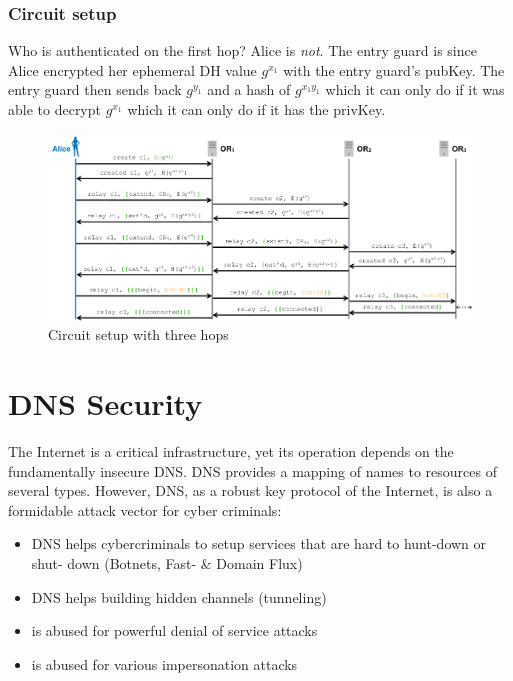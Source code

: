 \documentclass[11pt,oneside,a4paper]{article}
\begin{document}
\subsubsection{Circuit setup}

Who is authenticated on the first hop? Alice is \textit{not}. The entry guard is since Alice encrypted her ephemeral DH value $g^{x_1}$ with the entry guard's pubKey. The entry guard then sends back $g^{y_1}$ and a hash of $g^{x_1y_1}$ which it can only do if it was able to decrypt $g^{x_1}$ which it can only do if it has the privKey.
\begin{figure}[hb]
	\centering
	\includegraphics[width=0.9\linewidth]{figures/tor_circuit_setup}
	\caption{Circuit setup with three hops}
	\label{fig:torcircuitsetup}
\end{figure}

\section{DNS Security}

The Internet is a critical infrastructure, yet its operation depends on the fundamentally insecure DNS. DNS provides a mapping of names to resources of several types. However, DNS, as a robust key protocol of the Internet, is also a formidable attack vector for cyber criminals:

\vspace{-\topsep}
\begin{itemize}
	\setlength{\itemsep}{0pt}
	\setlength{\parskip}{0pt}
	\item DNS helps cybercriminals to setup services that are hard to hunt-down or shut-
	down (Botnets, Fast- \& Domain Flux)
	\item DNS helps building hidden channels (tunneling)
	\item is abused for powerful denial of service attacks
	\item is abused for various impersonation attacks
\end{itemize}
\vspace{-\topsep}
\end{document}
